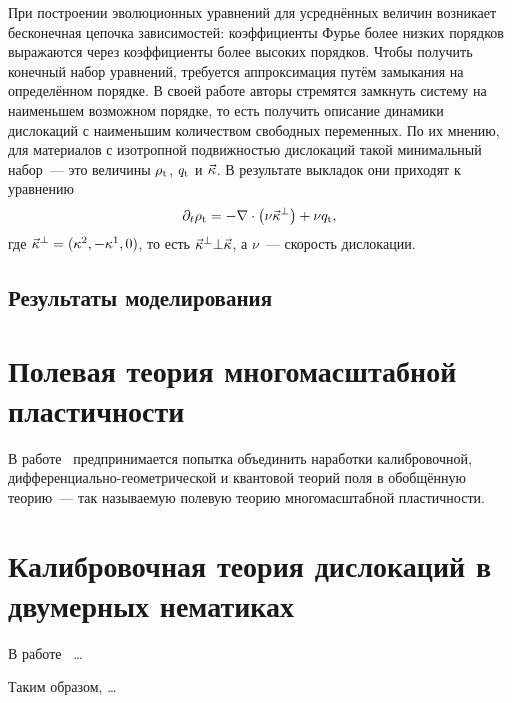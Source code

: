 \documentclass[a4paper, 14pt, titlepage]{extarticle}
\newcommand{\tot}{\textup{t}}    %
\begin{document}
  При построении эволюционных уравнений для усреднённых величин возникает бесконечная цепочка
  зависимостей: коэффициенты Фурье более низких порядков выражаются через коэффициенты более высоких
  порядков. Чтобы получить конечный набор уравнений, требуется аппроксимация путём замыкания на
  определённом порядке. В своей работе авторы стремятся замкнуть систему на наименьшем возможном
  порядке, то есть получить описание динамики дислокаций с наименьшим количеством свободных
  переменных. По их мнению, для материалов с изотропной подвижностью дислокаций такой минимальный
  набор~--- это величины $\rho_\tot$, $q_\tot$ и $\vec{\kappa}$. В результате выкладок они приходят
  к уравнению
  \[
    \partial_t \rho_\tot = - \nabla \cdot \left( \nu \vec{\kappa}^\bot \right) + \nu q_\tot ,
  \]
  где $\vec{\kappa}^\bot = (\kappa^2, -\kappa^1, 0)$, то есть $\vec{\kappa}^\bot \bot \vec{\kappa}$,
  а $\nu$~--- скорость дислокации.


  \subsection{Результаты моделирования}


  \section{Полевая теория многомасштабной пластичности}

  В работе~\cite{hasebe-ftmp} предпринимается попытка объединить наработки калибровочной,
  дифференциально-геометрической и квантовой теорий поля в обобщённую теорию~--- так называемую
  полевую теорию многомасштабной пластичности.

  \section{Калибровочная теория дислокаций в двумерных нематиках}

  В работе~\cite{liu-nematic} \dots


  Таким образом, \dots

  \PrintBibliography
\end{document}
